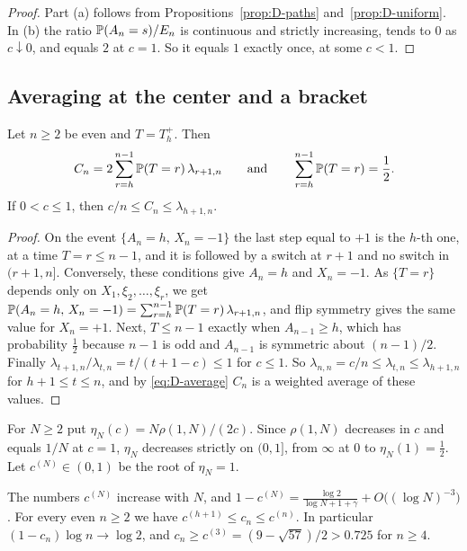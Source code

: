 \begin{proof}
Part (a) follows from Propositions~\ref{prop:D-paths} and~\ref{prop:D-uniform}. In (b) the
ratio $\mathbb{P}(A_n=s)/E_n$ is continuous and strictly increasing, tends to $0$ as $c\downarrow0$,
and equals $2$ at $c=1$. So it equals $1$ exactly once, at some $c<1$.
\end{proof}

\subsection{Averaging at the center and a bracket}

\begin{lemma}\label{lem:D-average}
Let $n\ge2$ be even and $T=T^+_h$. Then
\begin{equation}\label{eq:D-average}
C_n=2\sum_{r=h}^{n-1}\mathbb{P}(T=r)\,\lambda_{r+1,n}\qquad\text{and}\qquad
\sum_{r=h}^{n-1}\mathbb{P}(T=r)=\frac12 .
\end{equation}
If $0<c\le1$, then $c/n\le C_n\le\lambda_{h+1,n}$.
\end{lemma}

\begin{proof}
On the event $\{A_n=h,\,X_n=-1\}$ the last step equal to $+1$ is the $h$-th one, at a time
$T=r\le n-1$, and it is followed by a switch at $r+1$ and no switch in $(r+1,n]$. Conversely,
these conditions give $A_n=h$ and $X_n=-1$. As $\{T=r\}$ depends only on
$X_1,\xi_2,\dots,\xi_r$, we get
$\mathbb{P}(A_n=h,\,X_n=-1)=\sum_{r=h}^{n-1}\mathbb{P}(T=r)\,\lambda_{r+1,n}$, and flip symmetry gives the
same value for $X_n=+1$. Next, $T\le n-1$ exactly when $A_{n-1}\ge h$, which has probability
$\frac12$ because $n-1$ is odd and $A_{n-1}$ is symmetric about $(n-1)/2$. Finally
$\lambda_{t+1,n}/\lambda_{t,n}=t/(t+1-c)\le1$ for $c\le1$. So
$\lambda_{n,n}=c/n\le\lambda_{t,n}\le\lambda_{h+1,n}$ for $h+1\le t\le n$, and by
\eqref{eq:D-average} $C_n$ is a weighted average of these values.
\end{proof}

For $N\ge2$ put $\eta_N(c)=N\rho(1,N)/(2c)$. Since $\rho(1,N)$ decreases in $c$ and equals
$1/N$ at $c=1$, $\eta_N$ decreases strictly on $(0,1]$, from $\infty$ at $0$ to
$\eta_N(1)=\frac12$. Let $c^{(N)}\in(0,1)$ be the root of $\eta_N=1$.

\begin{theorem}[bracket]\label{thm:D-bracket}
The numbers $c^{(N)}$ increase with $N$, and
$1-c^{(N)}=\frac{\log2}{\log N+1+\gamma}+O\bigl((\log N)^{-3}\bigr)$. For every even $n\ge2$
we have $c^{(h+1)}\le c_n\le c^{(n)}$. In particular $(1-c_n)\log n\to\log2$, and
$c_n\ge c^{(3)}=(9-\sqrt{57})/2>0.725$ for $n\ge4$.
\end{theorem}

